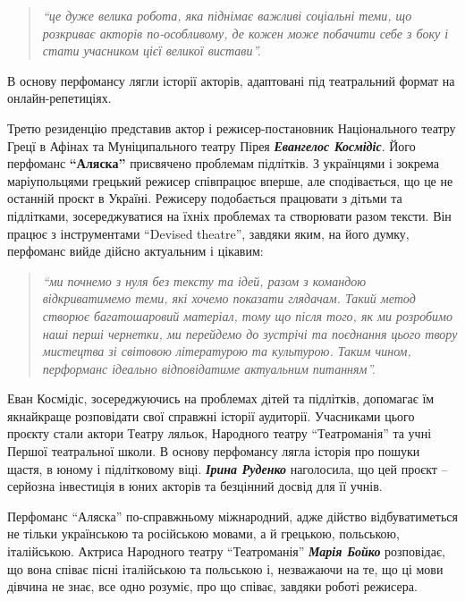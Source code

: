 \begin{quote}
\em\enquote{це дуже велика робота, яка піднімає важливі
соціальні теми, що розкриває акторів по-особливому, де кожен може побачити себе
з боку і стати учасником цієї великої вистави}. 
\end{quote}

В основу перфомансу лягли історії акторів, адаптовані під театральний формат на
онлайн-репетиціях.


Третю резиденцію представив актор і режисер-постановник Національного театру
Грецї в Афінах та Муніципального театру Пірея \emph{\textbf{Евангелос Космідіс}}. Його
перфоманс \textbf{\enquote{Аляска}} присвячено проблемам підлітків. З українцями і зокрема
маріупольцями грецький режисер співпрацює вперше, але сподівається, що це не
останній проєкт в Україні. Режисеру подобається працювати з дітьми та
підлітками, зосереджуватися на їхніх проблемах та створювати разом тексти. Він
працює з інструментами \enquote{Devised theatre}, завдяки яким, на його думку,
перфоманс вийде дійсно актуальним і цікавим: 

\begin{quote}
\em\enquote{ми почнемо з нуля без тексту та
ідей, разом з командою відкриватимемо теми, які хочемо показати глядачам. Такий
метод створює багатошаровий матеріал, тому що після того, як ми розробимо наші
перші чернетки, ми перейдемо до зустрічі та поєднання цього твору мистецтва зі
світовою літературою та культурою. Таким чином, перформанс ідеально
відповідатиме актуальним питанням}.
\end{quote}


Еван Космідіс, зосереджуючись на проблемах дітей та підлітків, допомагає їм
якнайкраще розповідати свої справжні історії аудиторії. Учасниками цього
проєкту стали актори Театру ляльок, Народного театру \enquote{Театроманія} та учні
Першої театральної школи. В основу перфомансу лягла історія про пошуки щастя, в
юному і підлітковому віці. \emph{\textbf{Ірина Руденко}} наголосила, що цей проєкт – серйозна
інвестиція  в юних акторів та безцінний досвід для її учнів.


Перфоманс \enquote{Аляска} по-справжньому міжнародний, адже дійство відбуватиметься не
тільки українською та російською мовами, а й грецькою, польською, італійською.
Актриса Народного театру \enquote{Театроманія} \emph{\textbf{Марія Бойко}} розповідає, що вона співає
пісні італійською та польською і, незважаючи на те, що ці мови дівчина не знає,
все одно розуміє, про що співає, завдяки роботі режисера.

